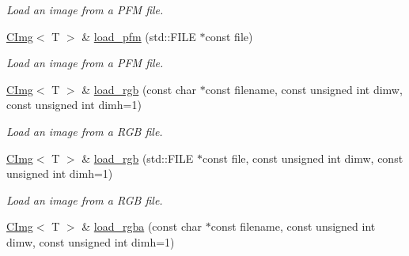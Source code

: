 \begin{DoxyCompactItemize}
\begin{DoxyCompactList}\small\item\em Load an image from a PFM file. \item\end{DoxyCompactList}\item 
\hypertarget{structcimg__library_1_1CImg_acb75d6c58f7f9f1bbc9b9e6702392734}{
\hyperlink{structcimg__library_1_1CImg}{CImg}$<$ T $>$ \& \hyperlink{structcimg__library_1_1CImg_acb75d6c58f7f9f1bbc9b9e6702392734}{load\_\-pfm} (std::FILE $\ast$const file)}
\label{structcimg__library_1_1CImg_acb75d6c58f7f9f1bbc9b9e6702392734}

\begin{DoxyCompactList}\small\item\em Load an image from a PFM file. \item\end{DoxyCompactList}\item 
\hypertarget{structcimg__library_1_1CImg_ac3cd73613729b55992811acee5015eab}{
\hyperlink{structcimg__library_1_1CImg}{CImg}$<$ T $>$ \& \hyperlink{structcimg__library_1_1CImg_ac3cd73613729b55992811acee5015eab}{load\_\-rgb} (const char $\ast$const filename, const unsigned int dimw, const unsigned int dimh=1)}
\label{structcimg__library_1_1CImg_ac3cd73613729b55992811acee5015eab}

\begin{DoxyCompactList}\small\item\em Load an image from a RGB file. \item\end{DoxyCompactList}\item 
\hypertarget{structcimg__library_1_1CImg_a742f2cd12dce7ae5521cf9a09c1e678c}{
\hyperlink{structcimg__library_1_1CImg}{CImg}$<$ T $>$ \& \hyperlink{structcimg__library_1_1CImg_a742f2cd12dce7ae5521cf9a09c1e678c}{load\_\-rgb} (std::FILE $\ast$const file, const unsigned int dimw, const unsigned int dimh=1)}
\label{structcimg__library_1_1CImg_a742f2cd12dce7ae5521cf9a09c1e678c}

\begin{DoxyCompactList}\small\item\em Load an image from a RGB file. \item\end{DoxyCompactList}\item 
\hypertarget{structcimg__library_1_1CImg_a27807907b967601fa7d51a024dd64e51}{
\hyperlink{structcimg__library_1_1CImg}{CImg}$<$ T $>$ \& \hyperlink{structcimg__library_1_1CImg_a27807907b967601fa7d51a024dd64e51}{load\_\-rgba} (const char $\ast$const filename, const unsigned int dimw, const unsigned int dimh=1)}
\label{structcimg__library_1_1CImg_a27807907b967601fa7d51a024dd64e51}


\end{DoxyCompactItemize}

